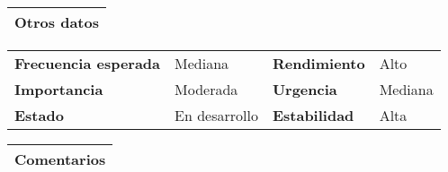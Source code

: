 \documentclass[11pt,a4paper]{article}
\begin{document}
\begin{table}[H]
	\begin{tabularx}{\textwidth}{X}
		\textbf{Otros datos}\\ \hline
	\end{tabularx}

	\begin{tabularx}{\textwidth}{lXlX}
		\textbf{Frecuencia esperada} & Mediana & \textbf{Rendimiento} & Alto\\
		\textbf{Importancia} & Moderada & \textbf{Urgencia} & Mediana \\
		\textbf{Estado} & En desarrollo & \textbf{Estabilidad} & Alta\\
	\end{tabularx}
	
	\begin{tabularx}{\textwidth}{X}
		\textbf{Comentarios}\\ \hline
	\end{tabularx}
\end{table}

\newpage


\end{document}
